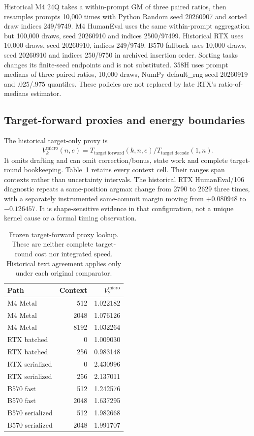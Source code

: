 Historical M4 24Q takes a within-prompt GM of three paired ratios, then resamples prompts 10,000 times with Python Random seed 20260907 and sorted draw indices 249/9749. M4 HumanEval uses the same within-prompt aggregation but 100,000 draws, seed 20260910 and indices 2500/97499. Historical RTX uses 10,000 draws, seed 20260910, indices 249/9749. B570 fallback uses 10,000 draws, seed 20260910 and indices 250/9750 in archived insertion order. Sorting tasks changes its finite-seed endpoints and is not substituted. 358H uses prompt medians of three paired ratios, 10,000 draws, NumPy default\_rng seed 20260919 and .025/.975 quantiles. These policies are not replaced by late RTX's ratio-of-medians estimator.

\subsection{Target-forward proxies and energy boundaries}
\label{supp:historical_proxies_energy}
The historical target-only proxy is
\[
V_k^{\mathrm{micro}}(n,e)=T_{\mathrm{target\ forward}}(k,n,e)/T_{\mathrm{target\ decode}}(1,n).
\]
It omits drafting and can omit correction/bonus, state work and complete target-round bookkeeping. Table~\ref{tab:proxy_lookup} retains every context cell. Their ranges span contexts rather than uncertainty intervals. The historical RTX HumanEval/106 diagnostic repeats a same-position argmax change from 2790 to 2629 three times, with a separately instrumented same-commit margin moving from $+0.080948$ to $-0.126457$. It is shape-sensitive evidence in that configuration, not a unique kernel cause or a formal timing observation.

\begin{table}[ht]\centering\small
\caption{Frozen target-forward proxy lookup. These are neither complete target-round cost nor integrated speed. Historical text agreement applies only under each original comparator.}
\label{tab:proxy_lookup}
\begin{tabular}{@{}lrr@{}}\toprule
Path & Context & $V_2^{\mathrm{micro}}$\\\midrule
M4 Metal & 512 & 1.022182\\
M4 Metal & 2048 & 1.076126\\
M4 Metal & 8192 & 1.032264\\
RTX batched & 0 & 1.009030\\
RTX batched & 256 & 0.983148\\
RTX serialized & 0 & 2.430996\\
RTX serialized & 256 & 2.137011\\
B570 fast & 512 & 1.242576\\
B570 fast & 2048 & 1.637295\\
B570 serialized & 512 & 1.982668\\
B570 serialized & 2048 & 1.991707\\\bottomrule
\end{tabular}
\end{table}


